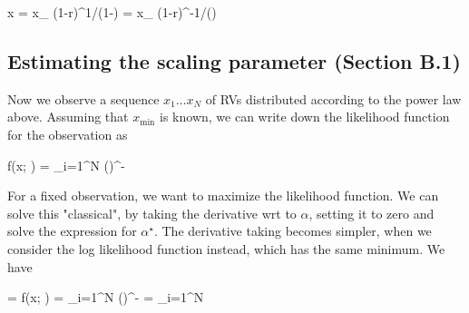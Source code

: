 








\be\label{2017-12-01:eq1}
x = x_{} (1-r)^{1/(1-\alpha)} = x_{} (1-r)^{-1/()}
\ee


\subsection{Estimating the scaling parameter (Section B.1)}

Now we observe a sequence $x_1 \ldots x_N$ of RVs distributed according to the power law above. Assuming that $x_{\text{min}}$ is known, we can write down the likelihood function for the observation as

\bee
f(x; \alpha) = \prod_{i=1}^N  \left(\right)^{-\alpha}
\eee

For a fixed observation, we want to maximize the likelihood function. We can solve this "classical", by taking the derivative wrt to $\alpha$, setting it to zero and solve the expression for $\alpha^\star$. The derivative taking becomes simpler, when we consider the log likelihood function instead, which has the same minimum. We have

\bee
{} = \ln f(x; \alpha) = 
\ln \prod_{i=1}^N  \left(\right)^{-\alpha} = 
\sum_{i=1}^N 
\eee

